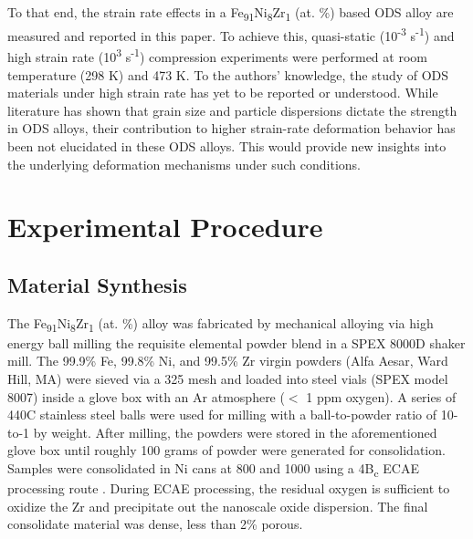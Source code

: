 	To that end, the strain rate effects in a Fe\textsubscript{91}Ni\textsubscript{8}Zr\textsubscript{1} (at. \%) based ODS alloy are measured and reported in this paper. To achieve this, quasi-static (10\textsuperscript{-3} s\textsuperscript{-1}) and high strain rate (10\textsuperscript{3} s\textsuperscript{-1}) compression experiments were performed at room temperature (298 K) and 473 K. To the authors’ knowledge, the study of ODS materials under high strain rate has yet to be reported or understood. While literature has shown that grain size and particle dispersions dictate the strength in ODS alloys, their contribution to higher strain-rate deformation behavior has been not elucidated in these ODS alloys. This would provide new insights into the underlying deformation mechanisms under such conditions.  

\section*{Experimental Procedure}
	\subsection*{Material Synthesis}
		The Fe\textsubscript{91}Ni\textsubscript{8}Zr\textsubscript{1 } (at. \%) alloy was fabricated by mechanical alloying via high energy ball milling the requisite elemental powder blend \cite{RN740} in a SPEX 8000D shaker mill. The 99.9\% Fe, 99.8\% Ni, and 99.5\% Zr virgin powders (Alfa Aesar, Ward Hill, MA) were sieved via a 325 mesh and loaded into steel vials (SPEX model 8007) inside a glove box with an Ar atmosphere ($<$ 1 ppm oxygen). A series of 440C stainless steel balls were used for milling with a ball-to-powder ratio of 10-to-1 by weight. After milling, the powders were stored in the aforementioned glove box until roughly 100 grams of powder were generated for consolidation. Samples were consolidated in Ni cans at 800 \celsius{} and 1000 \celsius{} using a 4B\textsubscript{c} ECAE processing route \cite{RN140}. During ECAE processing, the residual oxygen is sufficient to oxidize the Zr and precipitate out the nanoscale oxide dispersion. The final consolidate material was dense, less than 2\% porous.


